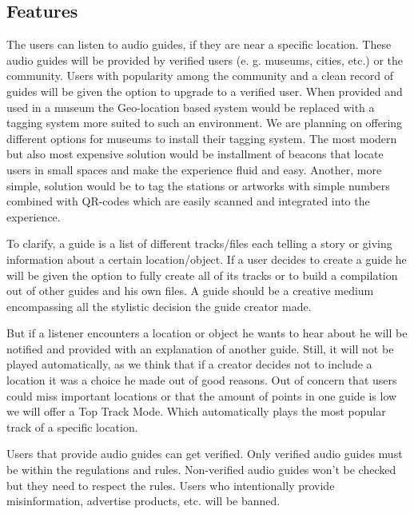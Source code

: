 \documentclass[12pt]{article}
\theoremstyle{definition}
\newenvironment{text}{
}{}
\begin{document}
\subsection{Features}
\begin{text}
The users can listen to audio guides, if they are near a specific location. These audio guides will be provided by verified users (e. g. museums, cities, etc.) or the community. Users with popularity among the community and a clean record of guides will be given the option to upgrade to a verified user.
When provided and used in a museum the Geo-location based system would be replaced with a tagging system more suited to such an environment.
We are planning on offering different options for museums to install their tagging system. The most modern but also most expensive solution would be installment of beacons that locate users in small spaces and make the experience fluid and easy.
Another, more simple, solution would be to tag the stations or artworks with simple numbers combined with QR-codes which are easily scanned and integrated into the experience.\newline
 
To clarify, a guide is a list of different tracks/files each telling a story or giving information about a certain location/object. If a user decides to create a guide he will be given the option to fully create all of its tracks or to build a compilation out of other guides and his own files. A guide should be a creative medium encompassing all the stylistic decision the guide creator made. \newline

But if a listener encounters a location or object he wants to hear about he will be notified and provided with an explanation of another guide. Still, it will not be played automatically, as we think that if a creator decides not to include a location it was a choice he made out of good reasons.
Out of concern that users could miss important locations or that the amount of points in one guide is low we will offer a Top Track Mode. Which automatically plays the most popular track of a specific location.\newline
 
Users that provide audio guides can get verified. Only verified audio guides must be within the regulations and rules. Non-verified audio guides won’t be checked but they need to respect the rules. Users who intentionally provide misinformation, advertise products, etc. will be banned.\newline
 

\end{text}
\end{document}
